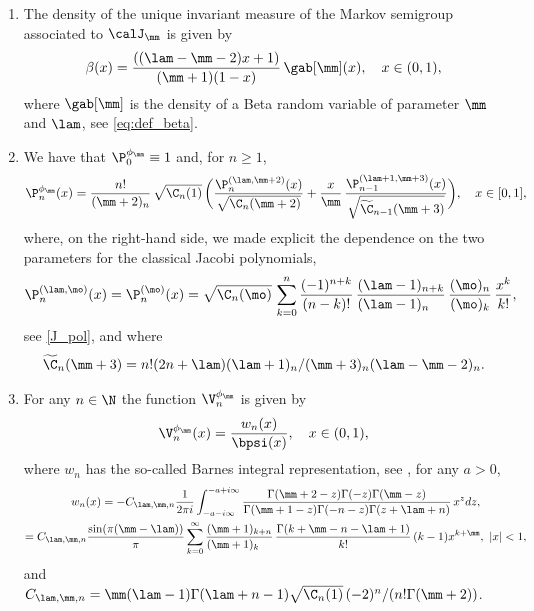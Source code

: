 \skpt
\begin{proposition}
\label{prop:small-perturbation}
\begin{enumerate}
\item \label{item-1:prop:small-perturbation} The density of the unique invariant measure of the Markov semigroup associated to $\calJ_\mm$ is given by
\begin{equation*}
\beta(x) = \frac{((\lam - \mm - 2)x+1)}{(\mm+1)(1-x)}\, \gab[\mm](x), \quad x \in (0,1),
\end{equation*}
where $\gab[\mm]$ is the density of a Beta random variable of parameter $\mm$ and $\lam$, see \eqref{eq:def_beta}.
\item \label{item-2:prop:small-perturbation} We have that $\P_0^{\phi_\mm} \equiv 1$ and, for $n \geq 1$,
\begin{equation*}
\P_n^{\phi_\mm}(x)= \frac{n!}{(\mm+2)_n}\, \sqrt{\C_n(1)}\, \biggl( \frac{\P_n^{(\lam,\mm+2 )} (x)}{\sqrt{\C_n(\mm+2)}} + \frac{x}{\mm}\, \frac{\P_{n-1}^{(\lam+1,\mm+3)}(x)}{\sqrt{\widetilde{\C}_{n-1}(\mm+3)}} \biggr), \quad x \in [0,1],
\end{equation*}
where, on the right-hand side, we made explicit the dependence on the two parameters for the classical Jacobi polynomials, \ie
\[
\P_n^{(\lam,\mo)} (x)=\P_n^{(\mo)} (x)=\sqrt{\C_n(\mo)}\, \sum_{k=0}^n \frac{(-1)^{n+k}}{(n-k)!}\, \frac{(\lam-1)_{n+k}}{(\lam-1)_{n\phantom{+k}}}\, \frac{(\mo)_n}{(\mo)_k}\, \frac{x^k}{k!},
\]
see \eqref{J_pol}, and where
\[
\widetilde{\C}_{n}(\mm+3) = n!(2n+\lam)(\lam+1)_n / (\mm+3)_n(\lam-\mm-2)_n.
\]

\item \label{item-3:prop:small-perturbation} For any $n \in \N$ the function $\V_n^{\phi_\mm}$ is given by
\begin{equation*}
\V_n^{\phi_\mm}(x) = \frac{w_n(x)}{\bpsi(x)}, \quad x \in (0,1),
\end{equation*}
where $w_n$ has the so-called Barnes integral representation, see \eg \cite{barnes_integrals}, for any $a>0$,
\begin{multline*}
w_n(x)
= -C_{\lam, \mm, n} \frac{1}{2 \pi i} \int_{-a - i \infty}^{-a + i \infty} \frac{\Gamma(\mm+2-z)\Gamma(-z)\Gamma(\mm-z)}{\Gamma(\mm+1-z)\Gamma(-n-z)\Gamma(z+\lam+n)}\, x^{z}dz, \\
= C_{\lam, \mm, n} \frac{\sin(\pi(\mm-\lam))}{\pi} \sum_{k = 0}^{\infty} \frac{(\mm+1)_{k+n}}{(\mm+1)_{k\phantom{+n}}}\, \frac{\Gamma(k+\mm-n-\lam+1)}{k!}\,(k-1) x^{k+\mm}, \ |x|<1,
\end{multline*}
and $C_{\lam, \mm, n} = \mm(\lam - 1) \Gamma(\lam+n-1) \sqrt{\C_n(1)}\, (-2)^n / (n!\Gamma(\mm+2))$.
\end{enumerate}
\end{proposition}


